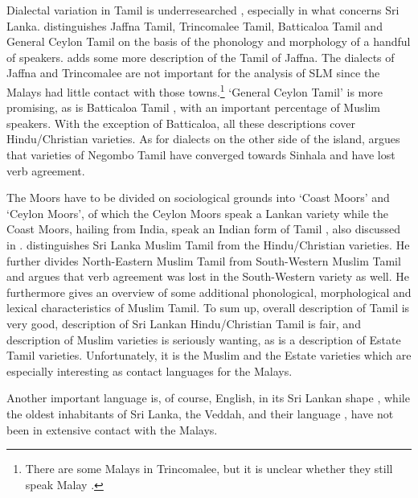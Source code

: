 Dialectal variation in Tamil is underresearched \citep{Pillai1986}, especially in what concerns Sri Lanka.
\citet{Zvelebil1960,
Zvelebil1966}
distinguishes Jaffna Tamil, Trincomalee Tamil, Batticaloa Tamil and General Ceylon Tamil  on the basis of the phonology and morphology of a handful of speakers. \citet{Suseendirarajah1967,Suseendirarajah1973phon} adds some more description of the Tamil of Jaffna. The dialects of Jaffna and Trincomalee are not important for the analysis of SLM since the Malays had little contact with those towns.\footnote{There are some Malays in Trincomalee, but it is unclear whether they still speak Malay \citep[426]{Hussein2007}.} `General Ceylon Tamil' is more promising, as is Batticaloa Tamil \citep{Zvelebil1966, Suseendirarajah1973pron,Batticaloa}, with an important percentage of Muslim speakers. With the exception of Batticaloa, all these descriptions cover Hindu/Christian varieties. As for dialects on the other side of the island, \citet{Bonta2004,Bonta2008} argues that varieties of Negombo Tamil have converged towards Sinhala and have lost verb agreement.

The Moors have to be divided on sociological grounds into `Coast Moors' and `Ceylon Moors', of which the Ceylon Moors speak a Lankan variety while the Coast Moors, hailing from India, speak an Indian form of Tamil \citep[25]{Nuhman2007}, also discussed in \citet{Hussein2007}.
\citet[71ff]{Nuhman2007} distinguishes Sri Lanka Muslim Tamil from the Hindu/Christian varieties. He further divides North-Eastern Muslim Tamil from South-Western Muslim Tamil \citep[also see][45]{Hussein2007} and argues that verb agreement was lost in the South-Western variety as well. He furthermore gives an overview of some additional phonological, morphological and lexical characteristics of Muslim Tamil. To sum up, overall description of Tamil is very good, description of Sri Lankan Hindu/Christian Tamil is fair, and description of Muslim varieties is seriously wanting, as is a description of Estate Tamil varieties. Unfortunately, it is the Muslim and the Estate varieties which are especially interesting as contact languages for the Malays.

Another important language is, of course, English, in its Sri Lankan shape \citep{Kandiah1996}, while the  oldest inhabitants of Sri Lanka, the Veddah, and their language \citep{DeSilva1972}, have not been in extensive contact with the Malays.

